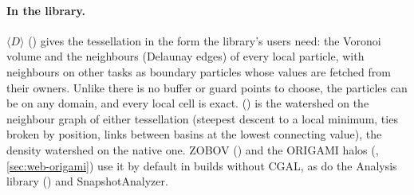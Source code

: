 \paragraph*{In the library.} $\langle D\rangle$ ()
gives the tessellation in the form the library's users need: the Voronoi volume and the neighbours (Delaunay edges) of every local
particle, with neighbours on other tasks as boundary particles whose values are fetched from their owners. Unlike
 there is no buffer or guard points to choose, the particles can be on any domain, and every local cell
is exact.  () is the watershed on the neighbour graph of either
tessellation (steepest descent to a local minimum, ties broken by position, links between basins at the lowest connecting
value),  the density watershed on the native one. ZOBOV () and the ORIGAMI halos (, \cref{sec:web-origami}) use it by default in builds
without CGAL, as do the Analysis library () and SnapshotAnalyzer.

